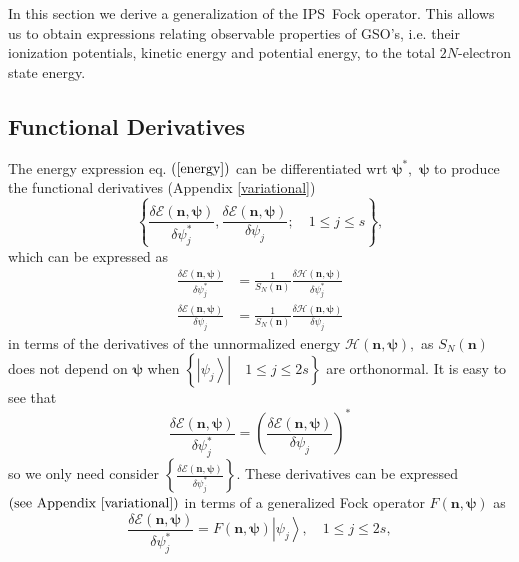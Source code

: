 \documentclass[aps,preprint]{revtex4}%
\begin{document}
In this section we derive a generalization of the IPS\ Fock operator. This
allows us to obtain expressions relating observable properties of GSO's, i.e.
their ionization potentials, kinetic energy and potential energy, to the total
$2N$-electron state energy.

\subsection{Functional Derivatives\label{FD}}

The energy expression eq. $\left(  \ref{energy}\right)  $ can be
differentiated wrt $\bm{\psi}^{\ast},$ $\bm{\psi}$ to produce the functional
derivatives (Appendix \ref{variational})
\begin{equation}
\left\{  \frac{\delta\mathcal{E}\left(  \bm{n,\psi}\right)  }{\delta\psi
_{j}^{\ast}},\frac{\delta\mathcal{E}\left(  \bm{n,\psi}\right)  }{\delta
\psi_{j}};\quad1\leq j\leq s\right\}  ,
\end{equation}
which can be expressed as%
\begin{align}
\frac{\delta\mathcal{E}\left(  \bm{n,\psi}\right)  }{\delta\psi_{j}^{\ast}}
&  =\frac{1}{S_{N}\left(  \bm{n}\right)  }\frac{\delta\mathcal{H}\left(
\bm{n,\psi}\right)  }{\delta\psi_{j}^{\ast}}\\
\frac{\delta\mathcal{E}\left(  \bm{n,\psi}\right)  }{\delta\psi_{j}}  &
=\frac{1}{S_{N}\left(  \bm{n}\right)  }\frac{\delta\mathcal{H}\left(
\bm{n,\psi}\right)  }{\delta\psi_{j}}%
\end{align}
in terms of the derivatives of the unnormalized energy $\mathcal{H}\left(
\bm{n,\psi}\right)  ,$ as $S_{N}\left(  \bm{n}\right)  $ does not depend on
$\bm{\psi}$ when $\left\{  \left.  \left\vert \psi_{j}\right\rangle
\right\vert \quad1\leq j\leq2s\right\}  $ are orthonormal. It is easy to see
that
\begin{equation}
\frac{\delta\mathcal{E}\left(  \bm{n,\psi}\right)  }{\delta\psi_{j}^{\ast}%
}=\left(  \frac{\delta\mathcal{E}\left(  \bm{n,\psi}\right)  }{\delta\psi_{j}%
}\right)  ^{\ast}%
\end{equation}
so we only need consider $\left\{  \frac{\delta\mathcal{E}\left(
\bm{n,\psi}\right)  }{\delta\psi_{j}^{\ast}}\right\}  .$ These derivatives can
be expressed $\left(  \text{see Appendix \ref{variational}}\right)  $ in terms
of a generalized Fock operator $F\left(  \bm{n,\psi}\right)  $ as
\begin{equation}
\frac{\delta\mathcal{E}\left(  \bm{n,\psi}\right)  }{\delta\psi_{j}^{\ast}%
}=F\left(  \bm{n,\psi}\right)  \left\vert \psi_{j}\right\rangle ,\quad1\leq
j\leq2s, \label{H_deriv}%
\end{equation}
\end{document}
